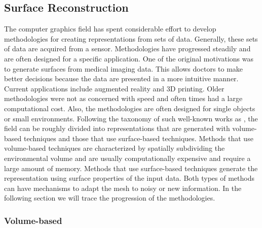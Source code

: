 \subsection{Surface Reconstruction}

The computer graphics field has spent considerable effort to develop methodologies
for creating representations from sets of data. Generally, these sets of
data are acquired from a sensor. Methodologies have progressed steadily and
are often designed for a specific application. One of the original motivations
was to generate surfaces from medical imaging data. This
allows doctors to make better decisions because the data are presented in a
more intuitive manner. Current applications include augmented reality and
3D printing. Older methodologies were not as concerned with speed and often
times had a large computational cost. Also, the methodologies are often
designed for single objects or small environments. Following the taxonomy
of such well-known works as \cite{Gopi2002,Mencl1997}, the field can be
roughly divided into representations that are generated with volume-based
techniques and those that use surface-based techniques. Methods that use
volume-based techniques are characterized by spatially subdividing the
environmental volume and are usually computationally expensive and require
a large amount of memory. Methods that use surface-based techniques
generate the representation using surface properties of the input data.
Both types of methods can have mechanisms to adapt the mesh to noisy or new
information.  In the following section we will trace the progression of the
methodologies.

\subsubsection{Volume-based}

